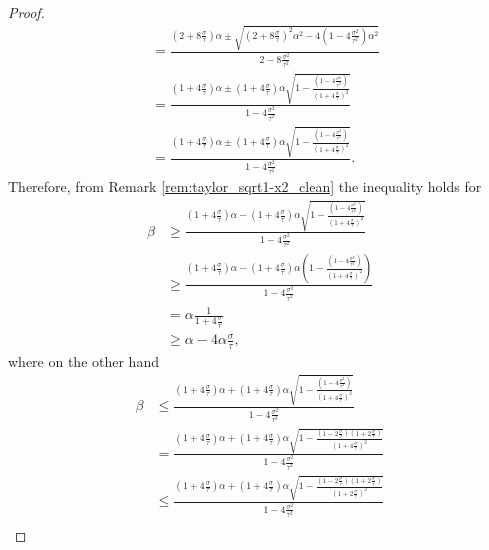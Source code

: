 \documentclass[12pt]{article}
\theoremstyle{remark}
\newcommand{\lrbrackets}[1]{\left( #1 \right)}
\begin{document}
\begin{appendices}
\begin{proof}
\begin{align*}
	&=
	\frac{\lrbrackets{2 +8\frac{\sigma}{\tau}}\alpha \pm \sqrt{\lrbrackets{2 + 8 \frac{\sigma}{\tau} }^2\alpha^2 - 4 \lrbrackets{1 - 4 \frac{\sigma^2}{\tau^2} }\alpha^2}}{2 - 8\frac{\sigma^2}{\tau^2}} \\
	&=
	\frac{\lrbrackets{1 +4\frac{\sigma}{\tau}}\alpha \pm \lrbrackets{1 + 4 \frac{\sigma}{\tau} }\alpha\sqrt{1 - \frac{\lrbrackets{1 - 4 \frac{\sigma^2}{\tau^2} }}{\lrbrackets{1 + 4 \frac{\sigma}{\tau} }^2}}}{1 - 4\frac{\sigma^2}{\tau^2}} \\
	&=
	\frac{\lrbrackets{1 +4\frac{\sigma}{\tau}}\alpha \pm \lrbrackets{1 + 4 \frac{\sigma}{\tau} }\alpha\sqrt{1 - \frac{\lrbrackets{1 - 4 \frac{\sigma^2}{\tau^2} }}{\lrbrackets{1 + 4 \frac{\sigma}{\tau} }^2}}}{1 - 4\frac{\sigma^2}{\tau^2}}
	.\end{align*}
	Therefore, from Remark \ref{rem:taylor_sqrt1-x2_clean} the inequality holds for
	\begin{align*}
	\beta 
	&\geq 
	\frac{\lrbrackets{1 +4\frac{\sigma}{\tau}}\alpha - \lrbrackets{1 + 4 \frac{\sigma}{\tau} }\alpha\sqrt{1 - \frac{\lrbrackets{1 - 4 \frac{\sigma^2}{\tau^2} }}{\lrbrackets{1 + 4 \frac{\sigma}{\tau} }^2}}}{1 - 4\frac{\sigma^2}{\tau^2}}\\
	&\geq
	\frac{\lrbrackets{1 +4\frac{\sigma}{\tau}}\alpha - \lrbrackets{1 + 4 \frac{\sigma}{\tau} }\alpha\lrbrackets{1 - \frac{\lrbrackets{1 - 4 \frac{\sigma^2}{\tau^2} }}{\lrbrackets{1 + 4 \frac{\sigma}{\tau} }^2}}}{1 - 4\frac{\sigma^2}{\tau^2}}\\
	&=
	\alpha\frac{1}{{1 + 4 \frac{\sigma}{\tau} }} \\
	&\geq 
	\alpha - 4\alpha\frac{\sigma}{\tau}
	,\end{align*}
	where on the other hand
	\begin{align*}
	\beta 
	&\leq
	\frac{\lrbrackets{1 +4\frac{\sigma}{\tau}}\alpha + \lrbrackets{1 + 4 \frac{\sigma}{\tau} }\alpha\sqrt{1 - \frac{\lrbrackets{1 - 4 \frac{\sigma^2}{\tau^2} }}{\lrbrackets{1 + 4 \frac{\sigma}{\tau} }^2}}}{1 - 4\frac{\sigma^2}{\tau^2}} \\
	&=
	\frac{\lrbrackets{1 +4\frac{\sigma}{\tau}}\alpha + \lrbrackets{1 + 4 \frac{\sigma}{\tau} }\alpha\sqrt{1 - \frac{\lrbrackets{1 - 2 \frac{\sigma}{\tau} }\lrbrackets{1 + 2 \frac{\sigma}{\tau} }}{\lrbrackets{1 + 4 \frac{\sigma}{\tau} }^2}}}{1 - 4\frac{\sigma^2}{\tau^2}} \\
	&\leq
	\frac{\lrbrackets{1 +4\frac{\sigma}{\tau}}\alpha + \lrbrackets{1 + 4 \frac{\sigma}{\tau} }\alpha\sqrt{1 - \frac{\lrbrackets{1 - 2 \frac{\sigma}{\tau} }\lrbrackets{1 + 2 \frac{\sigma}{\tau} }}{\lrbrackets{1 + 2 \frac{\sigma}{\tau} }^2}}}{1 - 4\frac{\sigma^2}{\tau^2}} \\

\end{align*}
\end{proof}
\end{appendices}
\end{document}

